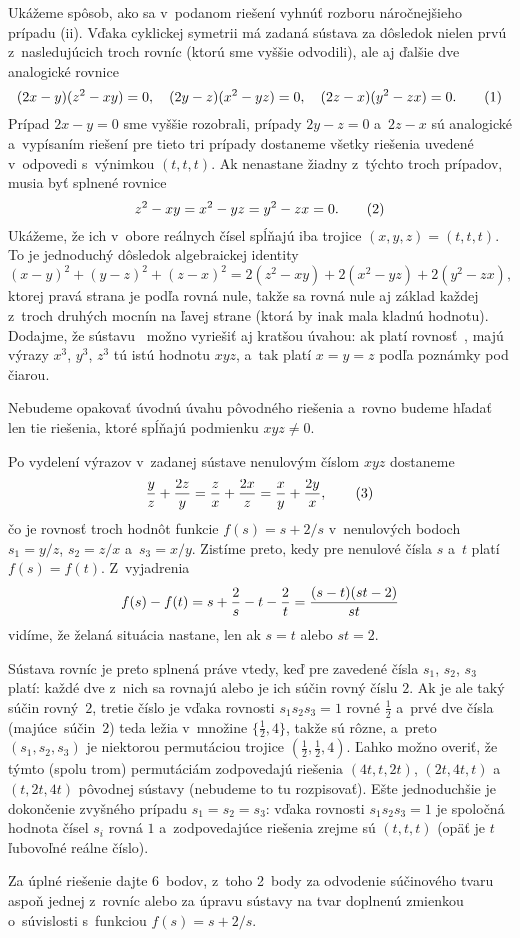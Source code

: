 {\poznamka
Ukážeme spôsob, ako sa v~podanom riešení vyhnúť
rozboru náročnejšieho prípadu (ii). Vďaka cyklickej symetrii má
zadaná sústava za dôsledok nielen prvú z~nasledujúcich troch rovníc
(ktorú sme vyššie odvodili), ale aj ďalšie dve analogické rovnice
$$
(2x-y)(z^2-xy)=0,\quad
(2y-z)(x^2-yz)=0,\quad
(2z-x)(y^2-zx)=0.
\tag1$$
Prípad $2x-y=0$ sme vyššie rozobrali, prípady $2y-z=0$
a~$2z-x$ sú analogické a~vypísaním riešení pre tieto tri prípady
dostaneme všetky riešenia uvedené v~odpovedi s~výnimkou $(t,t,t)$.
Ak nenastane žiadny z~týchto troch prípadov, musia byť splnené rovnice
$$
z^2-xy=x^2-yz=y^2-zx=0.
\tag2$$
Ukážeme, že ich v~obore reálnych čísel spĺňajú iba trojice
$(x,y,z)=(t,t,t)$. To je jednoduchý dôsledok algebraickej identity
$$
(x-y)^2+(y-z)^2+(z-x)^2=2(z^2-xy)+2(x^2-yz)+2(y^2-zx),
$$
ktorej pravá strana je podľa  rovná nule, takže sa rovná nule
aj základ každej z~troch druhých mocnín na ľavej strane (ktorá by inak
mala kladnú hodnotu).
Dodajme, že sústavu~ možno vyriešiť aj kratšou úvahou: ak platí rovnosť~,
majú výrazy $x^3$, $y^3$, $z^3$ tú istú hodnotu $xyz$, a~tak platí $x=y=z$
podľa poznámky pod čiarou.

\ineriesenie
Nebudeme opakovať úvodnú úvahu pôvodného
riešenia a~rovno budeme hľadať len tie riešenia, ktoré spĺňajú podmienku
$xyz\ne0$.

Po vydelení výrazov v~zadanej sústave nenulovým číslom $xyz$
dostaneme
$$
\frac{y}{z}+\frac{2z}{y}=\frac{z}{x}+\frac{2x}{z}=
\frac{x}{y}+\frac{2y}{x},
\tag3$$
čo je rovnosť troch hodnôt funkcie $f(s)=s+2/s$ v~nenulových
bodoch $s_1=y/z$, $s_2=z/x$ a~$s_3=x/y$. Zistíme preto, kedy pre
nenulové čísla $s$ a~$t$ platí $f(s)=f(t)$. Z~vyjadrenia
$$
\postdisplaypenalty 10000
f(s)-f(t)=s+\frac{2}{s}-t-\frac{2}{t}=\frac{(s-t)(st-2)}{st}
$$
vidíme, že želaná situácia nastane, len ak $s=t$ alebo $st=2$.

Sústava rovníc  je preto splnená práve vtedy, keď pre zavedené
čísla $s_1$, $s_2$, $s_3$ platí: každé dve z~nich sa rovnajú alebo je
ich súčin rovný číslu $2$. Ak je ale taký súčin rovný~$2$,
tretie číslo je vďaka rovnosti $s_1s_2s_3=1$ rovné
$\frac12$ a~prvé dve čísla (majúce~súčin~$2$) teda ležia v~množine
$\{\frac12,4\}$, takže sú rôzne, a~preto
$(s_1,s_2,s_3)$ je niektorou permutáciou
trojice $(\frac12,\frac12,4)$. Ľahko možno overiť, že týmto
(spolu trom) permutáciám zodpovedajú riešenia
$(4t,t,2t)$, $(2t,4t,t)$ a~$(t,2t,4t)$ pôvodnej sústavy
(nebudeme to tu rozpisovať). Ešte jednoduchšie je dokončenie zvyšného
prípadu $s_1=s_2=s_3$: vďaka rovnosti $s_1s_2s_3=1$ je spoločná
hodnota čísel $s_i$ rovná $1$ a~zodpovedajúce riešenia zrejme sú
$(t,t,t)$ (opäť je $t$ ľubovoľné reálne číslo).


\nobreak\medskip\petit\noindent
Za úplné riešenie dajte 6~bodov, z~toho 2~body za odvodenie
súčinového tvaru aspoň jednej z~rovníc  alebo za úpravu
sústavy na tvar  doplnenú zmienkou o~súvislosti s~funkciou
$f(s)=s+2/s$.

\endpetit
\bigbreak
}

